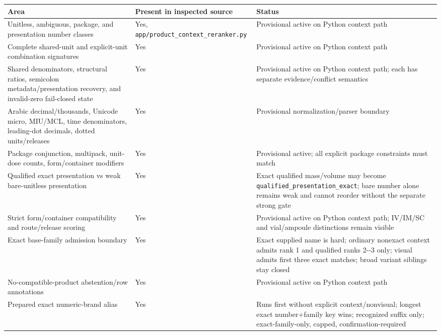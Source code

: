 {\def\LTcaptype{none} %
\begin{longtable}[]{@{}>{\RaggedRight\arraybackslash}p{.22\linewidth}>{\RaggedRight\arraybackslash}p{.34\linewidth}>{\RaggedRight\arraybackslash}p{.36\linewidth}@{}}
\toprule\noalign{}
Area & Present in inspected source & Status \\
\midrule\noalign{}
\endhead
\bottomrule\noalign{}
\endlastfoot
Unitless, ambiguous, package, and presentation number classes & Yes, \texttt{app/product\_\allowbreak{}context\_\allowbreak{}reranker.py} & Provisional active on Python context path \\
Complete shared-unit and explicit-unit combination signatures & Yes & Provisional active on Python context path \\
Shared denominators, structural ratios, semicolon metadata/presentation recovery, and invalid-zero fail-closed state & Yes & Provisional active on Python context path; each has separate evidence/conflict semantics \\
Arabic decimal/thousands, Unicode micro, MIU/MCL, time denominators, leading-dot decimals, dotted units/releases & Yes & Provisional normalization/parser boundary \\
Package conjunction, multipack, unit-dose counts, form/container modifiers & Yes & Provisional active; all explicit package constraints must match \\
Qualified exact presentation vs weak bare-unitless presentation & Yes & Exact qualified mass/volume may become \texttt{qualified\_\allowbreak{}presentation\_\allowbreak{}exact}; bare number alone remains weak and cannot reorder without the separate strong gate \\
Strict form/container compatibility and route/release scoring & Yes & Provisional active on Python context path; IV/IM/SC and vial/ampoule distinctions remain visible \\
Exact base-family admission boundary & Yes & Exact supplied name is hard; ordinary nonexact context admits rank 1 and qualified ranks 2-\/-3 only; visual admits first three exact matches; broad variant siblings stay closed \\
No-compatible-product abstention/row annotations & Yes & Provisional active on Python context path \\
Prepared exact numeric-brand alias & Yes & Runs first without explicit context/nonvisual; longest exact number+family key wins; recognized suffix only; exact-family-only, capped, confirmation-required \\

\end{longtable}}
